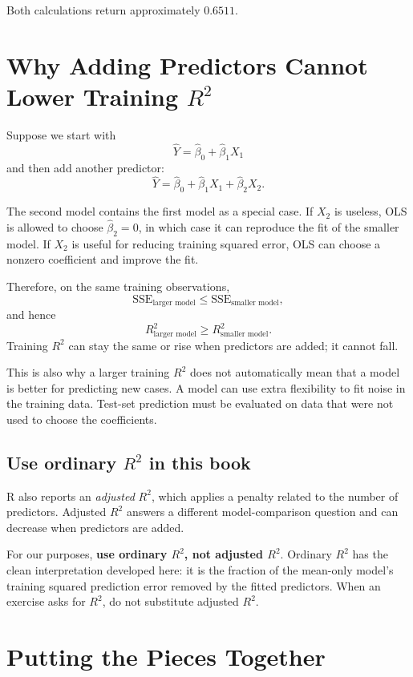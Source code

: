 \documentclass[11pt]{report}
\begin{document}
Both calculations return approximately \(0.6511\).

\section{Why Adding Predictors Cannot Lower Training \(R^2\)}

Suppose we start with
\[
\widehat{Y}
=
\widehat{\beta}_0+
\widehat{\beta}_1X_1
\]
and then add another predictor:
\[
\widehat{Y}
=
\widehat{\beta}_0+
\widehat{\beta}_1X_1+
\widehat{\beta}_2X_2.
\]

The second model contains the first model as a special case. If \(X_2\) is useless, OLS is allowed to choose \(\widehat{\beta}_2=0\), in which case it can reproduce the fit of the smaller model. If \(X_2\) is useful for reducing training squared error, OLS can choose a nonzero coefficient and improve the fit.

Therefore, on the same training observations,
\[
\text{SSE}_{\text{larger model}}
\leq
\text{SSE}_{\text{smaller model}},
\]
and hence
\[
R^2_{\text{larger model}}
\geq
R^2_{\text{smaller model}}.
\]
Training \(R^2\) can stay the same or rise when predictors are added; it cannot fall.

This is also why a larger training \(R^2\) does not automatically mean that a model is better for predicting new cases. A model can use extra flexibility to fit noise in the training data. Test-set prediction must be evaluated on data that were not used to choose the coefficients.

\subsection{Use ordinary \(R^2\) in this book}

R also reports an \emph{adjusted} \(R^2\), which applies a penalty related to the number of predictors. Adjusted \(R^2\) answers a different model-comparison question and can decrease when predictors are added.

For our purposes, \textbf{use ordinary \(R^2\), not adjusted \(R^2\)}. Ordinary \(R^2\) has the clean interpretation developed here: it is the fraction of the mean-only model's training squared prediction error removed by the fitted predictors. When an exercise asks for \(R^2\), do not substitute adjusted \(R^2\).

\section{Putting the Pieces Together}
\end{document}
